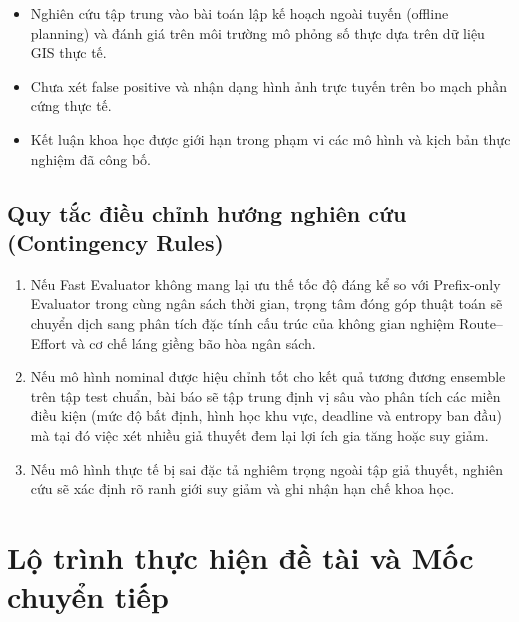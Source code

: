 \documentclass[12pt,a4paper]{article}
\begin{document}
\begin{itemize}
    \item Nghiên cứu tập trung vào bài toán lập kế hoạch ngoài tuyến (offline planning) và đánh giá trên môi trường mô phỏng số thực dựa trên dữ liệu GIS thực tế.
    \item Chưa xét false positive và nhận dạng hình ảnh trực tuyến trên bo mạch phần cứng thực tế.
    \item Kết luận khoa học được giới hạn trong phạm vi các mô hình và kịch bản thực nghiệm đã công bố.
\end{itemize}

\subsection{Quy tắc điều chỉnh hướng nghiên cứu (Contingency Rules)}

\begin{enumerate}[label=\textbf{\arabic*.}]
    \item Nếu Fast Evaluator không mang lại ưu thế tốc độ đáng kể so với Prefix-only Evaluator trong cùng ngân sách thời gian, trọng tâm đóng góp thuật toán sẽ chuyển dịch sang phân tích đặc tính cấu trúc của không gian nghiệm Route--Effort và cơ chế láng giềng bão hòa ngân sách.
    \item Nếu mô hình nominal được hiệu chỉnh tốt cho kết quả tương đương ensemble trên tập test chuẩn, bài báo sẽ tập trung định vị sâu vào phân tích các miền điều kiện (mức độ bất định, hình học khu vực, deadline và entropy ban đầu) mà tại đó việc xét nhiều giả thuyết đem lại lợi ích gia tăng hoặc suy giảm.
    \item Nếu mô hình thực tế bị sai đặc tả nghiêm trọng ngoài tập giả thuyết, nghiên cứu sẽ xác định rõ ranh giới suy giảm và ghi nhận hạn chế khoa học.
\end{enumerate}

\section{Lộ trình thực hiện đề tài và Mốc chuyển tiếp}
\end{document}
